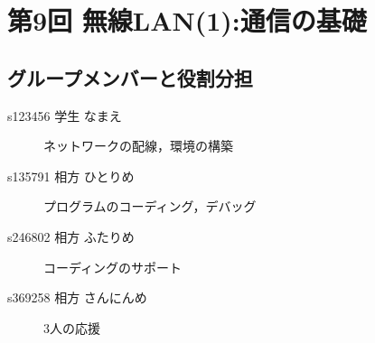 \documentclass[a4j]{celb-report}
\begin{document}

%

\section{第9回 無線LAN(1):通信の基礎}
\subsection{グループメンバーと役割分担}
%
\begin{description}
 \item[s123456 学生 なまえ] ネットワークの配線，環境の構築
 \item[s135791 相方 ひとりめ] プログラムのコーディング，デバッグ
 \item[s246802 相方 ふたりめ] コーディングのサポート
 \item[s369258 相方 さんにんめ] 3人の応援
\end{description}
\setcounter{subsection}{2}
\end{document}
